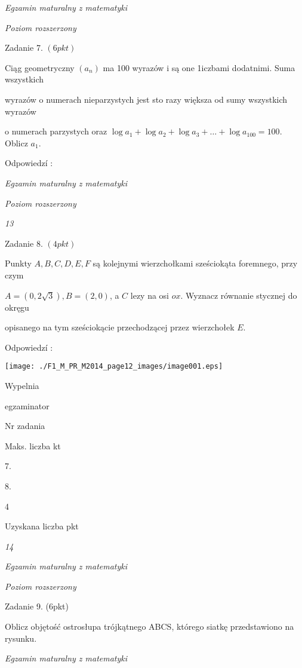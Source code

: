 \documentclass[a4paper,12pt]{article}
\begin{document}
{\it Egzamin maturalny z matematyki}

{\it Poziom rozszerzony}

Zadanie 7. $(6pkt)$

Ciąg geometryczny $(a_{n})$ ma 100 wyrazów i są one 1iczbami dodatnimi. Suma wszystkich

wyrazów o numerach nieparzystych jest sto razy większa od sumy wszystkich wyrazów

o numerach parzystych oraz $\log a_{1}+\log a_{2}+\log a_{3}+\ldots+\log a_{100}=100$. Oblicz $a_{1}.$

Odpowiedzí :





{\it Egzamin maturalny z matematyki}

{\it Poziom rozszerzony}

{\it 13}

Zadanie 8. $(4pkt)$

Punkty $A, B, C, D, E, F$ są kolejnymi wierzchołkami sześciokąta foremnego, przy czym

$A=(0,2\sqrt{3}), B=(2,0)$, a $C$ lezy na osi $ox$. Wyznacz równanie stycznej do okręgu

opisanego na tym sześciokącie przechodzącej przez wierzchołek $E.$

Odpowiedzí :
\begin{center}
\texttt{[image: ./F1\_M\_PR\_M2014\_page12\_images/image001.eps]}
\end{center}
Wypelnia

egzaminator

Nr zadania

Maks. liczba kt

7.

8.

4

Uzyskana liczba pkt





{\it 14}

{\it Egzamin maturalny z matematyki}

{\it Poziom rozszerzony}

Zadanie 9. (6pkt)

Oblicz objętość ostrosłupa trójkątnego ABCS, którego siatkę przedstawiono na rysunku.





{\it Egzamin maturalny z matematyki}
\end{document}
